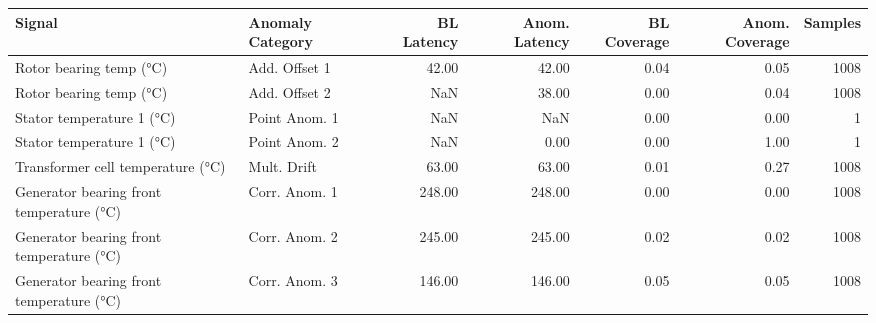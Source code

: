 \begin{tabular}{llrrrrr}
\toprule
Signal & Anomaly Category & BL Latency & Anom. Latency & BL Coverage & Anom. Coverage & Samples \\
\midrule
Rotor bearing temp (°C) & Add. Offset 1 & 42.00 & 42.00 & 0.04 & 0.05 & 1008 \\
Rotor bearing temp (°C) & Add. Offset 2 & NaN & 38.00 & 0.00 & 0.04 & 1008 \\
Stator temperature 1 (°C) & Point Anom. 1 & NaN & NaN & 0.00 & 0.00 & 1 \\
Stator temperature 1 (°C) & Point Anom. 2 & NaN & 0.00 & 0.00 & 1.00 & 1 \\
Transformer cell temperature (°C) & Mult. Drift & 63.00 & 63.00 & 0.01 & 0.27 & 1008 \\
Generator bearing front temperature (°C) & Corr. Anom. 1 & 248.00 & 248.00 & 0.00 & 0.00 & 1008 \\
Generator bearing front temperature (°C) & Corr. Anom. 2 & 245.00 & 245.00 & 0.02 & 0.02 & 1008 \\
Generator bearing front temperature (°C) & Corr. Anom. 3 & 146.00 & 146.00 & 0.05 & 0.05 & 1008 \\
\bottomrule
\end{tabular}
